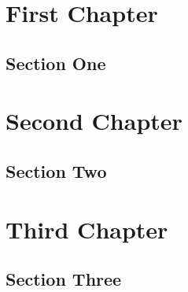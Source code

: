 \documentclass[a5paper,landscape]{book}
\begin{document}
\chapter{First Chapter}
\section{Section One}
\lipsum[1-2]

\chapter{Second Chapter}
\section{Section Two}
\lipsum[3-4]

\chapter{Third Chapter}
\section{Section Three}
\lipsum[5-6]
\end{document}
